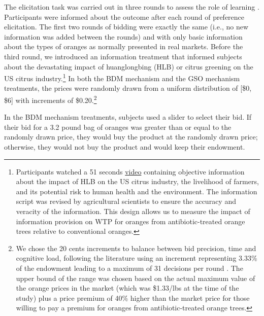 \documentclass[12pt]{article}
\begin{document}
The elicitation task was carried out in three rounds to assess the role of learning \citep{corrigan2008testing, drichoutis2011role}. Participants were informed about the outcome after each round of preference elicitation.
The first two rounds of bidding were exactly the same (i.e., no new information was added between the rounds) and with only basic information about the types of oranges as normally presented in real markets. Before the third round, we introduced an information treatment that informed subjects about the devastating impact of huanglongbing (HLB) or citrus greening on the US citrus industry.\footnote{Participants watched a 51 seconds \href{https://www.youtube.com/watch?v=_AqMBjB0ChM}{video} containing objective information about the impact of HLB on the US citrus industry, the livelihood of farmers, and its potential risk to human health and the environment. The information script was revised by agricultural scientists to ensure the accuracy and veracity of the information. This design allows us to measure the impact of information provision on WTP for oranges from antibiotic-treated orange trees relative to conventional oranges.} In both the BDM mechanism and the GSO mechanism treatments, the prices were randomly drawn from a uniform distribution of [\$0, \$6] with increments of \$0.20.\footnote{We chose the 20 cents increments to balance between bid precision, time and cognitive load, following the literature using an increment representing 3.33\% of the endowment leading to a maximum of 31 decisions per round \citep{li_obviously_2017, chakraborty_future_2025}. The upper bound of the range was chosen based on the actual maximum value of the orange prices in the market (which was \$1.33/lbs at the time of the study) plus a price premium of 40\% higher than the market price for those willing to pay a premium for oranges from antibiotic-treated orange trees.}

In the BDM mechanism treatments, subjects used a slider to select their bid. If their bid for a 3.2 pound bag of oranges was greater than or equal to the randomly drawn price, they would buy the product at the randomly drawn price; otherwise, they would not buy the product and would keep their endowment.
\end{document}
